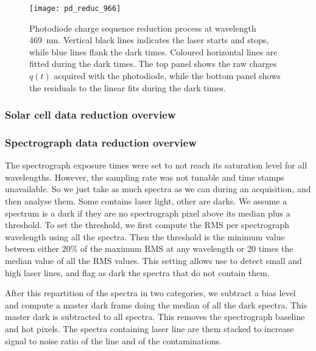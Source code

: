 \documentclass[printer]{aa}
\begin{document}
\begin{figure}[!h]
\centering
\texttt{[image: pd\_reduc\_966]}
\caption{Photodiode charge sequence reduction process at wavelength \SI{469}{\nm}. Vertical black lines indicates the laser starts and stops, while blue lines flank the dark times. Coloured horizontal lines are fitted during the dark times. The top panel shows the raw charges $q(t)$ acquired with the photodiode, while the bottom panel shows the residuals to the linear fits during the dark times.}
\end{figure}


\subsubsection{Solar cell data reduction overview}

\subsubsection{Spectrograph data reduction overview}

The spectrograph exposure times were set to not reach its saturation level for all wavelengths. However, the sampling rate was not tunable and time stamps unavailable. So we just take as much spectra as we can during an acquisition, and then analyse them. Some contains laser light, other are darks. We assume a spectrum is a dark if they are no spectrograph pixel above its median plus a threshold. To set the threshold, we first compute the RMS per spectrograph wavelength using all the spectra. Then the threshold is the minimum value between either 20\% of the maximum RMS at any wavelength or 20 times the median value of all the RMS values. This setting allows use to detect small and high laser lines, and flag as dark the spectra that do not contain them.

After this repartition of the spectra in two categories, we subtract a bias level and compute a master dark frame doing the median of all the dark spectra. This master dark is subtracted to all spectra. This removes the spectrograph baseline and hot pixels. The spectra containing laser line are them stacked to increase signal to noise ratio of the line and of the contaminations.
\end{document}
